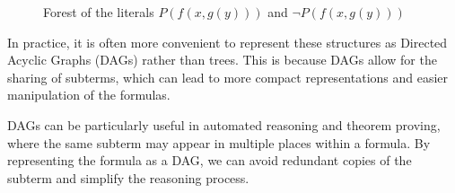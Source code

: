 \begin{figure}[H]
    \centering
    \begin{minipage}[t]{0.48\textwidth}
        \centering
    \end{minipage}
    \hfill
    \begin{minipage}[t]{0.48\textwidth}
        \centering
    \end{minipage}
    \caption{Forest of the literals \(P(f(x, g(y)))\) and \(\neg P(f(x, g(y)))\)}\label{fig:subterm_forest}
\end{figure}

In practice, it is often more convenient to represent these structures as Directed Acyclic Graphs (DAGs) rather than trees. This is because DAGs allow for the sharing of subterms, which can lead to more compact representations and easier manipulation of the formulas.

DAGs can be particularly useful in automated reasoning and theorem proving, where the same subterm may appear in multiple places within a formula. By representing the formula as a DAG, we can avoid redundant copies of the subterm and simplify the reasoning process.

